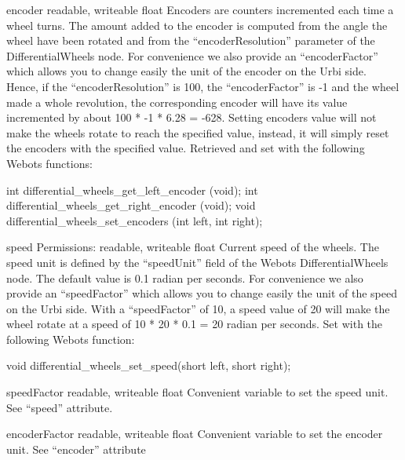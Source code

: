 \noindent
\begin{itemize}
\begin{attribute}{encoder}
  {readable, writeable}
  {float}
  {}
  Encoders are counters incremented each time a wheel
  turns. The amount added to the encoder is computed from the angle
  the wheel have been rotated and from the ``encoderResolution''
  parameter of the DifferentialWheels node. For convenience we also
  provide an ``encoderFactor'' which allows you to change easily the
  unit of the encoder on the Urbi side.  Hence, if the
  ``encoderResolution'' is 100, the ``encoderFactor'' is -{}1 and the
  wheel made a whole revolution, the corresponding encoder will have
  its value incremented by about 100 * -{}1 * 6.28 = -{}628.  Setting
  encoders value will not make the wheels rotate to reach the
  specified value, instead, it will simply reset the encoders with the
  specified value.  Retrieved and set with the following Webots
  functions:
\begin{cxx}
int differential_wheels_get_left_encoder (void);
int differential_wheels_get_right_encoder (void);
void differential_wheels_set_encoders (int left, int right);
\end{cxx}
\end{attribute}

\begin{attribute}{speed}
  {Permissions: readable, writeable}
  {float}
  {}
  Current speed of the wheels. The speed unit is defined
  by the ``speedUnit'' field of the Webots DifferentialWheels node. The
  default value is 0.1 radian per seconds. For convenience we also
  provide an ``speedFactor'' which allows you to change easily the unit
  of the speed on the Urbi side.  With a ``speedFactor'' of 10, a speed
  value of 20 will make the wheel rotate at a speed of 10 * 20 * 0.1 =
  20 radian per seconds.  Set with the following Webots function:
\begin{cxx}
void differential_wheels_set_speed(short left, short right);
\end{cxx}
\end{attribute}

\begin{attribute}{speedFactor}
  {readable, writeable}
  {float}
  {}
  Convenient variable to set the speed unit. See ``speed''
  attribute.
\end{attribute}

\begin{attribute}{encoderFactor}
  {readable, writeable}
  {float}
  {}
  Convenient variable to set the encoder unit. See
  ``encoder'' attribute
\end{attribute}

\end{itemize}

